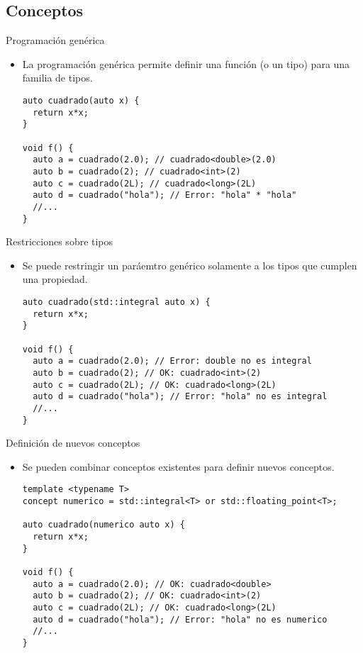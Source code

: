 \subsection{Conceptos}

\begin{frame}[t,fragile]{Programación genérica}
\begin{itemize}
  \item La programación genérica permite definir una función
        (o un tipo) para una familia de tipos.
\begin{lstlisting}
auto cuadrado(auto x) {
  return x*x;
}

void f() {
  auto a = cuadrado(2.0); // cuadrado<double>(2.0)
  auto b = cuadrado(2); // cuadrado<int>(2)
  auto c = cuadrado(2L); // cuadrado<long>(2L)
  auto d = cuadrado("hola"); // Error: "hola" * "hola"
  //...
}
\end{lstlisting}
\end{itemize}
\end{frame}

\begin{frame}[t,fragile]{Restricciones sobre tipos}
\begin{itemize}
  \item Se puede restringir un paráemtro genérico solamente
        a los tipos que cumplen una propiedad.
\begin{lstlisting}
auto cuadrado(std::integral auto x) {
  return x*x;
}

void f() {
  auto a = cuadrado(2.0); // Error: double no es integral
  auto b = cuadrado(2); // OK: cuadrado<int>(2)
  auto c = cuadrado(2L); // OK: cuadrado<long>(2L)
  auto d = cuadrado("hola"); // Error: "hola" no es integral
  //...
}
\end{lstlisting}
\end{itemize}
\end{frame}

\begin{frame}[t,fragile]{Definición de nuevos conceptos}
\begin{itemize}
  \item Se pueden combinar conceptos existentes para definir nuevos conceptos.
\begin{lstlisting}
template <typename T>
concept numerico = std::integral<T> or std::floating_point<T>;

auto cuadrado(numerico auto x) {
  return x*x;
}

void f() {
  auto a = cuadrado(2.0); // OK: cuadrado<double>
  auto b = cuadrado(2); // OK: cuadrado<int>(2)
  auto c = cuadrado(2L); // OK: cuadrado<long>(2L)
  auto d = cuadrado("hola"); // Error: "hola" no es numerico
  //...
}
\end{lstlisting}
\end{itemize}
\end{frame}
